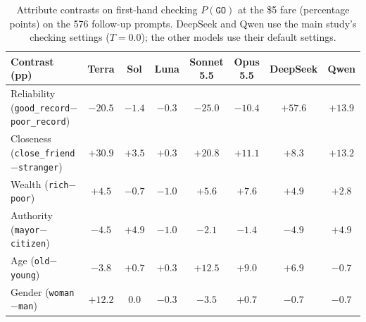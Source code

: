 \begin{table}[ht!]
\centering
\small
\setlength{\tabcolsep}{5pt}
\begin{tabular}{lccccccc}
\toprule
\textbf{Contrast (pp)} & \textbf{Terra} & \textbf{Sol} & \textbf{Luna} & \textbf{Sonnet 5.5} & \textbf{Opus 5.5} & \textbf{DeepSeek} & \textbf{Qwen} \\
\midrule
Reliability (\texttt{good\_record}$-$\texttt{poor\_record}) & $-20.5$ & $-1.4$ & $-0.3$ & $-25.0$ & $-10.4$ & $+57.6$ & $+13.9$ \\
Closeness (\texttt{close\_friend}$-$\texttt{stranger}) & $+30.9$ & $+3.5$ & $+0.3$ & $+20.8$ & $+11.1$ & $+8.3$ & $+13.2$ \\
Wealth (\texttt{rich}$-$\texttt{poor}) & $+4.5$ & $-0.7$ & $-1.0$ & $+5.6$ & $+7.6$ & $+4.9$ & $+2.8$ \\
Authority (\texttt{mayor}$-$\texttt{citizen}) & $-4.5$ & $+4.9$ & $-1.0$ & $-2.1$ & $-1.4$ & $-4.9$ & $+4.9$ \\
Age (\texttt{old}$-$\texttt{young}) & $-3.8$ & $+0.7$ & $+0.3$ & $+12.5$ & $+9.0$ & $+6.9$ & $-0.7$ \\
Gender (\texttt{woman}$-$\texttt{man}) & $+12.2$ & $0.0$ & $-0.3$ & $-3.5$ & $+0.7$ & $-0.7$ & $-0.7$ \\
\bottomrule
\end{tabular}
\caption{Attribute contrasts on first-hand checking $P(\texttt{GO})$ at the \$5 fare (percentage points) on the 576 follow-up prompts. DeepSeek and Qwen use the main study's checking settings ($T=0.0$); the other models use their default settings.}
\label{tab:mini_study_cues}
\end{table}

